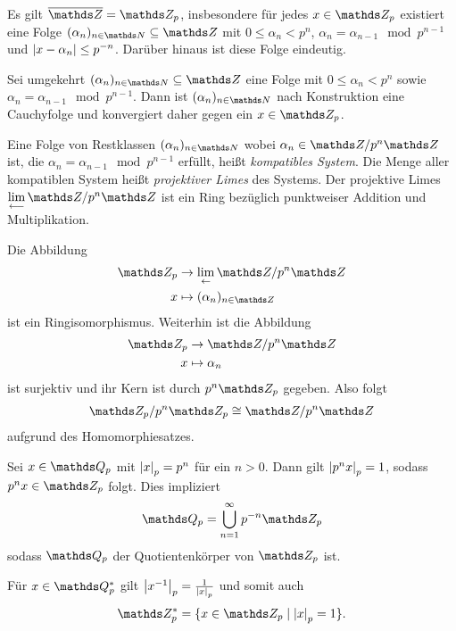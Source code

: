 \begin{cor}
Es gilt $\overline{\Z}=\Z_p$, insbesondere für jedes $x \in \Z_p$ existiert eine Folge
$(\alpha_n)_{n\in \N}\subseteq \Z$ mit $0 \leq \alpha_n<p^n$, $\alpha_n=\alpha_{n-1} \mod p^{n-1}$ und $\left\vert x-\alpha_n\right\vert\leq p^{-n}$.
Darüber hinaus ist diese Folge eindeutig.
\end{cor}

Sei umgekehrt $(\alpha_n)_{n \in \N}\subseteq \Z$ eine Folge mit $0\leq \alpha_n <p^n$ sowie $\alpha_n=\alpha_{n-1} \mod p^{n-1}$.
Dann ist $(\alpha_n)_{n\in \N}$ nach Konstruktion eine Cauchyfolge und konvergiert daher gegen ein $x\in \Z_p$.

\begin{defi}
Eine Folge von Restklassen $(\alpha_n)_{n\in \N}$ wobei $\alpha_n \in \Z / p^n\Z$ ist, die $\alpha_n=\alpha_{n-1} \mod p^{n-1}$ erfüllt, heißt \emph{kompatibles System}.
Die Menge aller kompatiblen System heißt \emph{projektiver Limes} des Systems.
Der projektive Limes $\lim\limits_{\longleftarrow} \Z /p^n\Z$ ist ein Ring bezüglich punktweiser Addition und Multiplikation.
\end{defi}

\begin{thm}
Die Abbildung
\begin{align*}
\Z_p &\to \lim_{\leftarrow} \Z/p^n\Z\\
x &\mapsto (\alpha_n)_{n\in \Z}
\end{align*}
ist ein Ringisomorphismus.
Weiterhin ist die Abbildung
\begin{align*}
\Z_p &\to \Z /p^n \Z\\
x &\mapsto \alpha_n
\end{align*}
ist surjektiv und ihr Kern ist durch $p^n\Z_p$ gegeben.
Also folgt
\begin{align*}
\Z_p /p^n \Z_p \cong \Z /p^n \Z
\end{align*}
aufgrund des Homomorphiesatzes.
\end{thm}

\begin{lem}
Sei $x\in \Q_p$ mit $\left\vert x\right\vert_p=p^n$ für ein $n>0$.
Dann gilt $\left\vert p^n x\right\vert_p=1$, sodass $p^nx\in \Z_p$ folgt.
Dies impliziert
\begin{align*}
\Q_p=\bigcup_{n=1}^\infty p^{-n}\Z_p
\end{align*}
sodass $\Q_p$ der Quotientenkörper von $\Z_p$ ist.
\end{lem}

Für $x\in \Q_p^\ast$ gilt $\left\vert x^{-1}\right\vert_p=\frac{1}{\left\vert x\right\vert_p}$ und somit auch
\begin{align*}
\Z_p^\ast=\{x\in \Z_p \mid \abs{x}_p=1\}.
\end{align*}



